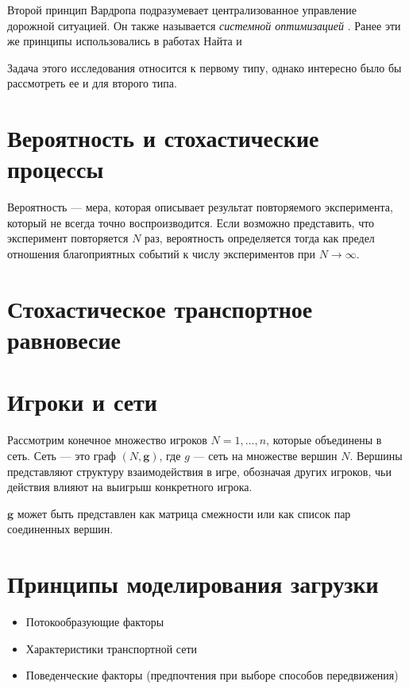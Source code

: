Второй принцип Вардропа подразумевает централизованное управление дорожной ситуацией. Он также называется \textit{системной оптимизацией} \cite[26-27]{gas}. Ранее эти же принципы использовались в работах Найта \cite{knight} и 

Задача этого исследования относится к первому типу, однако интересно было бы рассмотреть ее и для второго типа. 


\section{Вероятность и стохастические процессы}

Вероятность --- мера, которая описывает результат повторяемого эксперимента, который не всегда точно воспроизводится. Если возможно представить, что эксперимент повторяется $N$ раз, вероятность определяется тогда как предел отношения благоприятных событий к числу экспериментов при $N\to\infty$.


\section{Стохастическое транспортное равновесие} \cite[316, Ю. Е. Нестеров, С. В. Шпирко]{gas}

\section{Игроки и сети} \cite[4]{GandN}

Рассмотрим конечное множество игроков $N = {1,...,n}$, которые объединены в сеть. 
Сеть --- это граф $(N, \mathbf{g})$, где $g$ --- сеть на множестве вершин $N$.
Вершины представляют структуру взаимодействия в игре, обозначая других игроков, чьи действия влияют на выигрыш конкретного игрока.

$\mathbf{g}$ может быть представлен как матрица смежности или как список пар соединенных вершин.


\section{Принципы моделирования загрузки}
\begin{itemize}
	\item Потокообразующие факторы
	\item Характеристики транспортной сети
	\item Поведенческие факторы (предпочтения при выборе способов передвижения)
\end{itemize}

